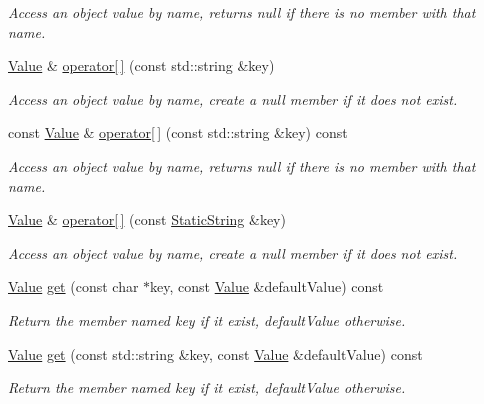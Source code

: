 \begin{DoxyCompactItemize}
\begin{DoxyCompactList}\small\item\em Access an object value by name, returns null if there is no member with that name. \end{DoxyCompactList}\item 
\hyperlink{classJson_1_1Value}{Value} \& \hyperlink{classJson_1_1Value_abe307d6088dfa1299729f795259f590e}{operator\mbox{[}$\,$\mbox{]}} (const std\-::string \&key)
\begin{DoxyCompactList}\small\item\em Access an object value by name, create a null member if it does not exist. \end{DoxyCompactList}\item 
const \hyperlink{classJson_1_1Value}{Value} \& \hyperlink{classJson_1_1Value_a3c53bfd2381d5a61036d7dc0b023d697}{operator\mbox{[}$\,$\mbox{]}} (const std\-::string \&key) const 
\begin{DoxyCompactList}\small\item\em Access an object value by name, returns null if there is no member with that name. \end{DoxyCompactList}\item 
\hyperlink{classJson_1_1Value}{Value} \& \hyperlink{classJson_1_1Value_ac191343a7ee2ca54827d67d934200d4f}{operator\mbox{[}$\,$\mbox{]}} (const \hyperlink{classJson_1_1StaticString}{Static\-String} \&key)
\begin{DoxyCompactList}\small\item\em Access an object value by name, create a null member if it does not exist. \end{DoxyCompactList}\item 
\hyperlink{classJson_1_1Value}{Value} \hyperlink{classJson_1_1Value_ab76b3323cde14c7db20676d07b260ce7}{get} (const char $\ast$key, const \hyperlink{classJson_1_1Value}{Value} \&default\-Value) const 
\begin{DoxyCompactList}\small\item\em Return the member named key if it exist, default\-Value otherwise. \end{DoxyCompactList}\item 
\hyperlink{classJson_1_1Value}{Value} \hyperlink{classJson_1_1Value_a54a34264356e01ee9c21a75ccfc809e9}{get} (const std\-::string \&key, const \hyperlink{classJson_1_1Value}{Value} \&default\-Value) const 
\begin{DoxyCompactList}\small\item\em Return the member named key if it exist, default\-Value otherwise. \end{DoxyCompactList}\item 

\end{DoxyCompactItemize}
